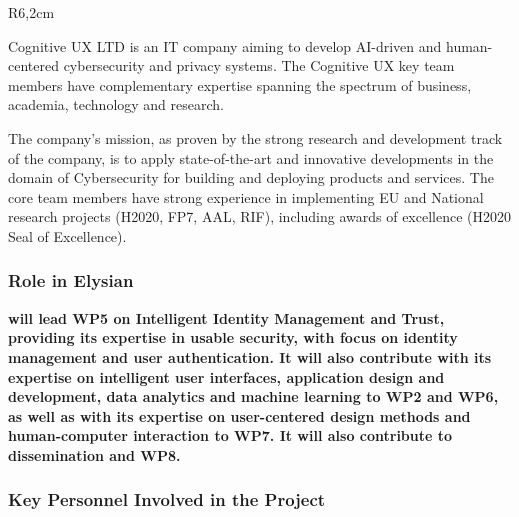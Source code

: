\documentclass[a4paper,11pt]{article}
\begin{document}

\begin{wrapfigure}{R}{6,2cm}
\vspace{-3cm}
\hfill {}
\vspace{-1cm}
\end{wrapfigure}
\vspace{10pt}

Cognitive UX LTD is an IT company aiming to develop AI-driven and human-centered cybersecurity and privacy systems. The Cognitive UX key team members have complementary expertise spanning the spectrum of business, academia, technology and research. 

The company’s mission, as proven by the strong research and development track of the company, is to apply state-of-the-art and innovative developments in the domain of Cybersecurity for building and deploying products and services. The core team members have strong experience in implementing EU and National research projects (H2020, FP7, AAL, RIF), including awards of excellence (H2020 Seal of Excellence).

\subsubsection*{Role in Elysian}
\textbf{\COGNIshort{} will lead WP5 on Intelligent Identity Management and Trust, providing its expertise in usable security, with focus on identity management and user authentication. It will also contribute with its expertise on intelligent user interfaces, application design and development, data analytics and machine learning to WP2 and WP6, as well as with its expertise on user-centered design methods and human-computer interaction to WP7. It will also contribute to dissemination and WP8.}

\subsubsection*{Key Personnel Involved in the Project}
\end{document}
